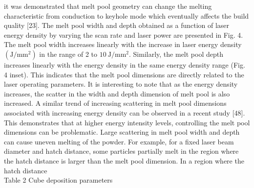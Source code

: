 \documentclass[10pt]{article}
\begin{document}
it was demonstrated that melt pool geometry can change the melting characteristic from conduction to keyhole mode which eventually affects the build quality [23]. The melt pool width and depth obtained as a function of laser energy density by varying the scan rate and laser power are presented in Fig. 4. The melt pool width increases linearly with the increase in laser energy density $\left(\mathrm{J} / \mathrm{mm}^{2}\right)$ in the range of 2 to $10 \mathrm{~J} / \mathrm{mm}^{2}$. Similarly, the melt pool depth increases linearly with the energy density in the same energy density range (Fig. 4 inset). This indicates that the melt pool dimensions are directly related to the laser operating parameters. It is interesting to note that as the energy density increases, the scatter in the width and depth dimension of melt pool is also increased. A similar trend of increasing scattering in melt pool dimensions associated with increasing energy density can be observed in a recent study [48]. This demonstrates that at higher energy intensity levels, controlling the melt pool dimensions can be problematic. Large scattering in melt pool width and depth can cause uneven melting of the powder. For example, for a fixed laser beam diameter and hatch distance, some particles partially melt in the region where the hatch distance is larger than the melt pool dimension. In a region where the hatch distance\\
Table 2 Cube deposition parameters
\end{document}
